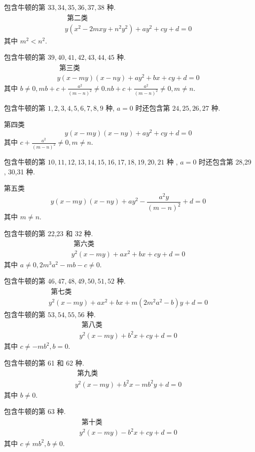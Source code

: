 包含牛顿的第 $33,34,35,36,37,38$ 种.
\[
\begin{gathered}
\text { 第二类 } \\
y\left(x^{2}-2 m x y+n^{2} y^{2}\right)+a y^{2}+c y+d=0
\end{gathered}
\]
其中 $m^{2}<n^{2}$.

包含牛顿的第 $39,40,41,42,43,44,45$ 种.
\[
\begin{gathered}
\text { 第三类 } \\
y(x-m y)(x-n y)+a y^{2}+b x+c y+d=0
\end{gathered}
\]
其中 $b \neq 0, m b+c+\frac{a^{2}}{(m-n)^{2}} \neq 0 . n b+c+\frac{a^{2}}{(m-n)^{2}} \neq 0, m \neq n$.

包含牛顿的第 $1,2,3,4,5,6,7,8,9$ 种, $a=0$ 时还包含第 $24,25,26,27$ 种.

第四类
\[
y(x-m y)(x-n y)+a y^{2}+c y+d=0
\]
其中 $c+\frac{a^{2}}{(m-n)^{2}} \neq 0, m \neq n$.

包含牛顿的第 $10,11,12,13,14,15,16,17,18,19,20,21$ 种 , $a=0$ 时还包含第 28,29 , 30,31 种.

第五类
\[
y(x-m y)(x-n y)+a y^{2}-\frac{a^{2} y}{(m-n)^{2}}+d=0
\]
其中 $m \neq n$.

包含牛顿的第 22,23 和 32 种.
\[
\begin{gathered}
\text { 第六类 } \\
y^{2}(x-m y)+a x^{2}+b x+c y+d=0
\end{gathered}
\]
其中 $a \neq 0,2 m^{3} a^{2}-m b-c \neq 0$.

包含牛顿的第 $46,47,48,49,50,51,52$ 种.
\[
\begin{gathered}
\text { 第七类 } \\
y^{2}(x-m y)+a x^{2}+b x+m\left(2 m^{2} a^{2}-b\right) y+d=0
\end{gathered}
\]
包含牛顿的第 $53,54,55,56$ 种.
\[
\begin{gathered}
\text { 第八类 } \\
y^{2}(x-m y)+b^{2} x+c y+d=0
\end{gathered}
\]
其中 $c \neq-m b^{2}, b=0$.

包含牛顿的第 61 和 62 种.
\[
\begin{gathered}
\text { 第九类 } \\
y^{2}(x-m y)+b^{2} x-m b^{2} y+d=0
\end{gathered}
\]
其中 $b \neq 0$.

包含牛顿的第 63 种.
\[
\begin{gathered}
\text { 第十类 } \\
y^{2}(x-m y)-b^{2} x+c y+d=0
\end{gathered}
\]
其中 $c \neq m b^{2}, b \neq 0$.

